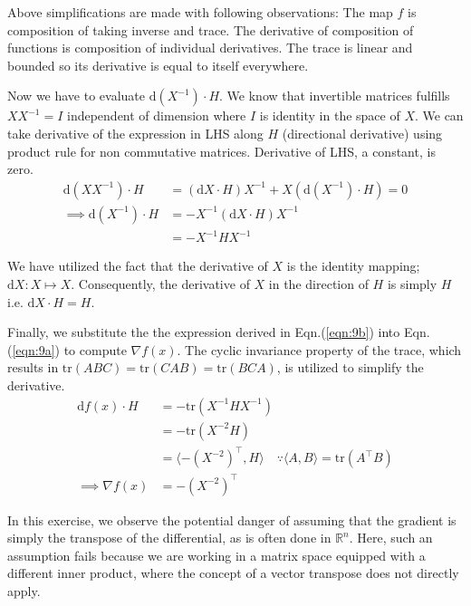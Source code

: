 \documentclass{article}
\begin{document}
\begin{enumerate}[start=9]
\begin{ans_box}
  Above simplifications are made with following observations: The map $f$ is composition of taking inverse and trace. The derivative of composition of functions is composition of individual derivatives. The trace is linear and bounded so its derivative is equal to itself everywhere.\medskip

  Now we have to evaluate $\text{d}(X^{-1})\cdot H$. We know that invertible matrices fulfills $XX^{-1}=I$ independent of dimension where $I$ is identity in the space of $X$. We can take derivative of the expression in LHS along $H$ (directional derivative) using product rule for non commutative matrices. Derivative of LHS, a constant, is zero.
  \begin{equation}
    \begin{split}
      \label{eqn:9b}
      \text{d}(XX^{-1})\cdot H&=(\text{d}X\cdot H)X^{-1}+X\left(\text{d}(X^{-1})\cdot H\right)=0\\
      \implies\text{d}(X^{-1})\cdot H&=-X^{-1}(\text{d}X\cdot H)X^{-1}\\
      &=-X^{-1}HX^{-1}
    \end{split}
  \end{equation}

  We have utilized the fact that the derivative of $X$ is the identity mapping; $\text{d}X:X\mapsto X$. Consequently, the derivative of $X$ in the direction of $H$ is simply $H$ i.e. $\text{d}X\cdot H=H$.\medskip

  Finally, we substitute the the expression derived in Eqn.(\ref{eqn:9b}) into Eqn.(\ref{eqn:9a}) to compute $\nabla f(x)$. The cyclic invariance property of the trace, which results in $\text{tr}(ABC)=\text{tr}(CAB)=\text{tr}(BCA)$, is utilized to simplify the derivative.
  \begin{equation*}
    \begin{split}
      \text{d}f(x)\cdot H&=-\text{tr}(X^{-1}HX^{-1})\\
      &=-\text{tr}(X^{-2}H)\\
      &=\langle-(X^{-2})^{\top},H\rangle\quad\because\langle A,B\rangle=\text{tr}(A^{\top}B)\\
      \implies\nabla f(x)&=-(X^{-2})^{\top}
    \end{split}
  \end{equation*}

  In this exercise, we observe the potential danger of assuming that the gradient is simply the transpose of the differential, as is often done in $\mathbb{R}^{n}$. Here, such an assumption fails because we are working in a matrix space equipped with a different inner product, where the concept of a vector transpose does not directly apply.
  \end{ans_box}


\end{enumerate}
\end{document}
